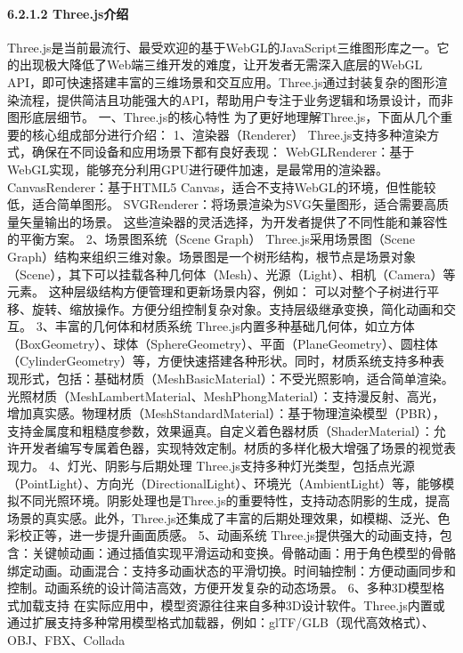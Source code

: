 {\paragraph{6.2.1.2 Three.js介绍}\label{three.jsux4ecbux7ecd}
Three.js是当前最流行、最受欢迎的基于WebGL的JavaScript三维图形库之一。它的出现极大降低了Web端三维开发的难度，让开发者无需深入底层的WebGL
API，即可快速搭建丰富的三维场景和交互应用。Three.js通过封装复杂的图形渲染流程，提供简洁且功能强大的API，帮助用户专注于业务逻辑和场景设计，而非图形底层细节。 一、Three.js的核心特性
为了更好地理解Three.js，下面从几个重要的核心组成部分进行介绍： 1、渲染器（Renderer） Three.js支持多种渲染方式，确保在不同设备和应用场景下都有良好表现：
WebGLRenderer：基于WebGL实现，能够充分利用GPU进行硬件加速，是最常用的渲染器。 CanvasRenderer：基于HTML5 Canvas，适合不支持WebGL的环境，但性能较低，适合简单图形。
SVGRenderer：将场景渲染为SVG矢量图形，适合需要高质量矢量输出的场景。 这些渲染器的灵活选择，为开发者提供了不同性能和兼容性的平衡方案。 2、场景图系统（Scene Graph） Three.js采用场景图（Scene
Graph）结构来组织三维对象。场景图是一个树形结构，根节点是场景对象（Scene），其下可以挂载各种几何体（Mesh）、光源（Light）、相机（Camera）等元素。 这种层级结构方便管理和更新场景内容，例如：
可以对整个子树进行平移、旋转、缩放操作。方便分组控制复杂对象。支持层级继承变换，简化动画和交互。 3、丰富的几何体和材质系统
Three.js内置多种基础几何体，如立方体（BoxGeometry）、球体（SphereGeometry）、平面（PlaneGeometry）、圆柱体（CylinderGeometry）等，方便快速搭建各种形状。同时，材质系统支持多种表现形式，包括：基础材质（MeshBasicMaterial）：不受光照影响，适合简单渲染。光照材质（MeshLambertMaterial、MeshPhongMaterial）：支持漫反射、高光，增加真实感。物理材质（MeshStandardMaterial）：基于物理渲染模型（PBR），支持金属度和粗糙度参数，效果逼真。自定义着色器材质（ShaderMaterial）：允许开发者编写专属着色器，实现特效定制。材质的多样化极大增强了场景的视觉表现力。
4、灯光、阴影与后期处理
Three.js支持多种灯光类型，包括点光源（PointLight）、方向光（DirectionalLight）、环境光（AmbientLight）等，能够模拟不同光照环境。阴影处理也是Three.js的重要特性，支持动态阴影的生成，提高场景的真实感。此外，Three.js还集成了丰富的后期处理效果，如模糊、泛光、色彩校正等，进一步提升画面质感。
5、动画系统
Three.js提供强大的动画支持，包含：关键帧动画：通过插值实现平滑运动和变换。骨骼动画：用于角色模型的骨骼绑定动画。动画混合：支持多动画状态的平滑切换。时间轴控制：方便动画同步和控制。动画系统的设计简洁高效，方便开发复杂的动态场景。
6、多种3D模型格式加载支持 在实际应用中，模型资源往往来自多种3D设计软件。Three.js内置或通过扩展支持多种常用模型格式加载器，例如：glTF/GLB（现代高效格式）、OBJ、FBX、Collada
}
